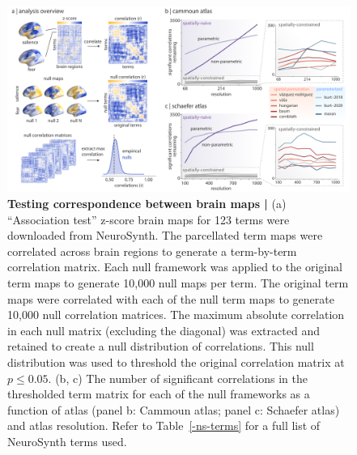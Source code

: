 \documentclass[12pt,aps,pra,reprint,showkeys]{revtex4-1}
\begin{document}
\begin{figure}[htp]
  \begin{center}
    \centerline{\includegraphics[width=\textwidth]{neurosynth_results.png}}
    \caption{
      \textbf{Testing correspondence between brain maps |}
      (a) ``Association test'' z-score brain maps for 123 terms were downloaded from NeuroSynth.
      The parcellated term maps were correlated across brain regions to generate a term-by-term correlation matrix.
      Each null framework was applied to the original term maps to generate 10,000 null maps per term.
      The original term maps were correlated with each of the null term maps to generate 10,000 null correlation matrices.
      The maximum absolute correlation in each null matrix (excluding the diagonal) was extracted and retained to create a null distribution of correlations.
      This null distribution was used to threshold the original correlation matrix at $p \leq 0.05$.
      (b, c) The number of significant correlations in the thresholded term matrix for each of the null frameworks as a function of atlas (panel b: Cammoun atlas; panel c: Schaefer atlas) and atlas resolution.
      Refer to Table~\ref{-ns-terms} for a full list of NeuroSynth terms used.}
    \label{figure-neurosynth-results}
  \end{center}
\end{figure}
\end{document}
